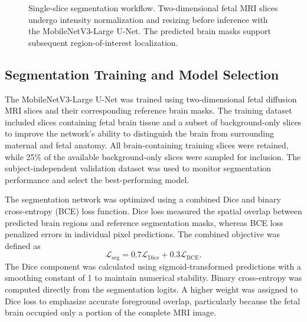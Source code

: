 \begin{figure}[htbp]
\centering

\caption{Single-slice segmentation workflow. Two-dimensional fetal MRI slices undergo intensity normalization and resizing before inference with the MobileNetV3-Large U-Net. The predicted brain masks support subsequent region-of-interest localization.}
\label{fig:single_slice_segmentation_workflow}
\end{figure}

\subsection{Segmentation Training and Model Selection}
\label{subsec:2d_segmentation_training}

The MobileNetV3-Large U-Net was trained using two-dimensional fetal diffusion MRI slices and their corresponding reference brain masks. The training dataset included slices containing fetal brain tissue and a subset of background-only slices to improve the network's ability to distinguish the brain from surrounding maternal and fetal anatomy. All brain-containing training slices were retained, while 25\% of the available background-only slices were sampled for inclusion. The subject-independent validation dataset was used to monitor segmentation performance and select the best-performing model.

The segmentation network was optimized using a combined Dice and binary cross-entropy (BCE) loss function. Dice loss measured the spatial overlap between predicted brain regions and reference segmentation masks, whereas BCE loss penalized errors in individual pixel predictions. The combined objective was defined as
\begin{equation}
\mathcal{L}_{\mathrm{seg}} =
0.7\mathcal{L}_{\mathrm{Dice}}+
0.3\mathcal{L}_{\mathrm{BCE}}.
\end{equation}
The Dice component was calculated using sigmoid-transformed predictions with a smoothing constant of 1 to maintain numerical stability. Binary cross-entropy was computed directly from the segmentation logits. A higher weight was assigned to Dice loss to emphasize accurate foreground overlap, particularly because the fetal brain occupied only a portion of the complete MRI image.

